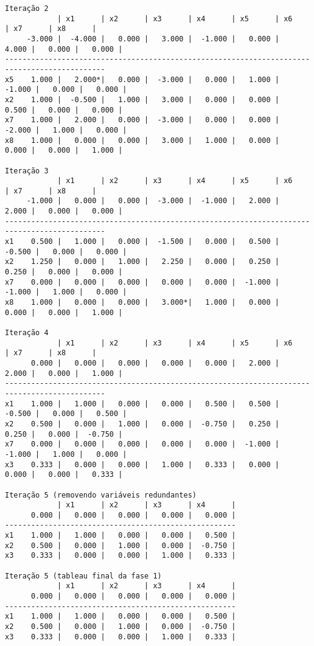 \documentclass[12pt,a4paper]{article}
\begin{document}
\begin{tiny}
\begin{verbatim}
Iteração 2
            | x1      | x2      | x3      | x4      | x5      | x6      | x7      | x8      |
     -3.000 |  -4.000 |   0.000 |   3.000 |  -1.000 |   0.000 |   4.000 |   0.000 |   0.000 |
---------------------------------------------------------------------------------------------
x5    1.000 |   2.000*|   0.000 |  -3.000 |   0.000 |   1.000 |  -1.000 |   0.000 |   0.000 |
x2    1.000 |  -0.500 |   1.000 |   3.000 |   0.000 |   0.000 |   0.500 |   0.000 |   0.000 |
x7    1.000 |   2.000 |   0.000 |  -3.000 |   0.000 |   0.000 |  -2.000 |   1.000 |   0.000 |
x8    1.000 |   0.000 |   0.000 |   3.000 |   1.000 |   0.000 |   0.000 |   0.000 |   1.000 |

Iteração 3
            | x1      | x2      | x3      | x4      | x5      | x6      | x7      | x8      |
     -1.000 |   0.000 |   0.000 |  -3.000 |  -1.000 |   2.000 |   2.000 |   0.000 |   0.000 |
---------------------------------------------------------------------------------------------
x1    0.500 |   1.000 |   0.000 |  -1.500 |   0.000 |   0.500 |  -0.500 |   0.000 |   0.000 |
x2    1.250 |   0.000 |   1.000 |   2.250 |   0.000 |   0.250 |   0.250 |   0.000 |   0.000 |
x7    0.000 |   0.000 |   0.000 |   0.000 |   0.000 |  -1.000 |  -1.000 |   1.000 |   0.000 |
x8    1.000 |   0.000 |   0.000 |   3.000*|   1.000 |   0.000 |   0.000 |   0.000 |   1.000 |

Iteração 4
            | x1      | x2      | x3      | x4      | x5      | x6      | x7      | x8      |
      0.000 |   0.000 |   0.000 |   0.000 |   0.000 |   2.000 |   2.000 |   0.000 |   1.000 |
---------------------------------------------------------------------------------------------
x1    1.000 |   1.000 |   0.000 |   0.000 |   0.500 |   0.500 |  -0.500 |   0.000 |   0.500 |
x2    0.500 |   0.000 |   1.000 |   0.000 |  -0.750 |   0.250 |   0.250 |   0.000 |  -0.750 |
x7    0.000 |   0.000 |   0.000 |   0.000 |   0.000 |  -1.000 |  -1.000 |   1.000 |   0.000 |
x3    0.333 |   0.000 |   0.000 |   1.000 |   0.333 |   0.000 |   0.000 |   0.000 |   0.333 |

Iteração 5 (removendo variáveis redundantes)
            | x1      | x2      | x3      | x4      |
      0.000 |   0.000 |   0.000 |   0.000 |   0.000 |
-----------------------------------------------------
x1    1.000 |   1.000 |   0.000 |   0.000 |   0.500 |
x2    0.500 |   0.000 |   1.000 |   0.000 |  -0.750 |
x3    0.333 |   0.000 |   0.000 |   1.000 |   0.333 |

Iteração 5 (tableau final da fase 1)
            | x1      | x2      | x3      | x4      |
      0.000 |   0.000 |   0.000 |   0.000 |   0.000 |
-----------------------------------------------------
x1    1.000 |   1.000 |   0.000 |   0.000 |   0.500 |
x2    0.500 |   0.000 |   1.000 |   0.000 |  -0.750 |
x3    0.333 |   0.000 |   0.000 |   1.000 |   0.333 |


\end{verbatim}
\end{tiny}
\end{document}
